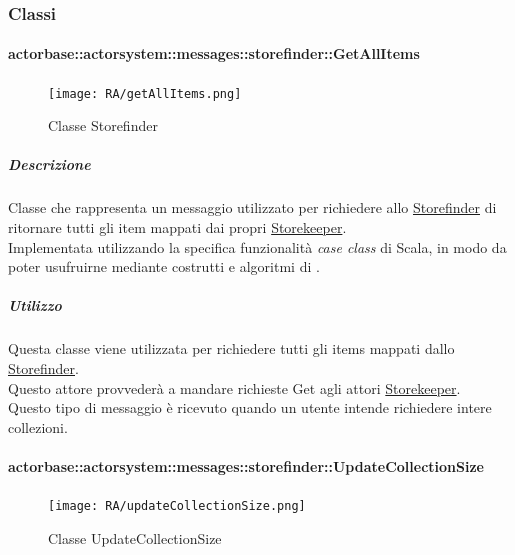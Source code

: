 \documentclass{scalatekids-article}
\begin{document}
\subsubsection{Classi}

\paragraph{actorbase::actorsystem::messages::storefinder::GetAllItems}
\label{sec:actorbase::actorsystem::messages::storefinder::GetAllItems}

\begin{figure}[H]
  \begin{center}
    \texttt{[image: RA/getAllItems.png]}
    \caption{Classe Storefinder}
  \end{center}
\end{figure}

\subparagraph{Descrizione}
Classe che rappresenta un messaggio utilizzato per richiedere allo
\hyperref[sec:actorbase::actorsystem::actors::storefinder::Storefinder]{Storefinder} di ritornare tutti gli item mappati dai propri \hyperref[sec:actorbase::actorsystem::actors::storekeeper::Storekeeper]{Storekeeper}.\\Implementata utilizzando la specifica funzionalità \textit{case class} di Scala,
in modo da poter usufruirne mediante costrutti e algoritmi di
.

\subparagraph{Utilizzo}
Questa classe viene utilizzata per richiedere tutti gli items mappati dallo
\hyperref[sec:actorbase::actorsystem::actors::storefinder::Storefinder]{Storefinder}.\\Questo attore provvederà a mandare richieste Get agli attori
\hyperref[sec:actorbase::actorsystem::actors::storekeeper::Storekeeper]{Storekeeper}.\\Questo tipo di messaggio è ricevuto quando un utente intende
richiedere intere collezioni.

\paragraph{actorbase::actorsystem::messages::storefinder::UpdateCollectionSize}
\label{sec:actorbase::actorsystem::messages::storefinder::UpdateCollectionSize}

\begin{figure}[H]
  \begin{center}
    \texttt{[image: RA/updateCollectionSize.png]}
    \caption{Classe UpdateCollectionSize}
  \end{center}
\end{figure}
\end{document}
